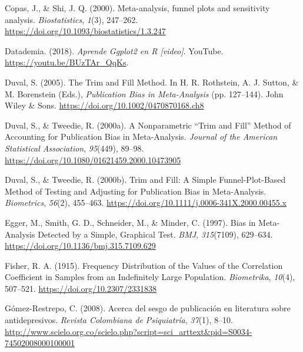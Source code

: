 \documentclass[
  bookmarksnumbered]{article}
\newlength{\cslhangindent}
\newlength{\cslentryspacingunit} %
\newenvironment{CSLReferences}[2] %
 {%
  \setlength{\parindent}{0pt}
  \ifodd #1
  \let\oldpar\par
  \def\par{\hangindent=\cslhangindent\oldpar}
  \fi
  \setlength{\parskip}{#2\cslentryspacingunit}
 }%
 {}
\begin{document}
\begin{CSLReferences}{1}{0}
\leavevmode{}%
Copas, J., \& Shi, J. Q. (2000). Meta-analysis, funnel plots and sensitivity analysis. \emph{Biostatistics}, \emph{1}(3), 247--262. \url{https://doi.org/10.1093/biostatistics/1.3.247}

\leavevmode{}%
Datademia. (2018). \emph{Aprende {Ggplot2} en {R} \emph{{[}video{]}}}. YouTube. \url{https://youtu.be/BUzTAr_QqKs}.

\leavevmode{}%
Duval, S. (2005). The {Trim} and {Fill Method}. In H. R. Rothstein, A. J. Sutton, \& M. Borenstein (Eds.), \emph{Publication {Bias} in {Meta-Analysis}} (pp. 127--144). {John Wiley \& Sons}. \url{https://doi.org/10.1002/0470870168.ch8}

\leavevmode{}%
Duval, S., \& Tweedie, R. (2000a). A {Nonparametric} {``{Trim} and {Fill}''} {Method} of {Accounting} for {Publication Bias} in {Meta-Analysis}. \emph{Journal of the American Statistical Association}, \emph{95}(449), 89--98. \url{https://doi.org/10.1080/01621459.2000.10473905}

\leavevmode{}%
Duval, S., \& Tweedie, R. (2000b). Trim and {Fill}: {A Simple Funnel-Plot-Based Method} of {Testing} and {Adjusting} for {Publication Bias} in {Meta-Analysis}. \emph{Biometrics}, \emph{56}(2), 455--463. \url{https://doi.org/10.1111/j.0006-341X.2000.00455.x}

\leavevmode{}%
Egger, M., Smith, G. D., Schneider, M., \& Minder, C. (1997). {Bias in Meta-Analysis Detected by a Simple, Graphical Test}. \emph{BMJ}, \emph{315}(7109), 629--634. \url{https://doi.org/10.1136/bmj.315.7109.629}

\leavevmode{}%
Fisher, R. A. (1915). Frequency {Distribution} of the {Values} of the {Correlation Coefficient} in {Samples} from an {Indefinitely Large Population}. \emph{Biometrika}, \emph{10}(4), 507--521. \url{https://doi.org/10.2307/2331838}

\leavevmode{}%
Gómez-Restrepo, C. (2008). {Acerca del sesgo de publicación en literatura sobre antidepresivos}. \emph{Revista Colombiana de Psiquiatría}, \emph{37}(1), 8--10. \url{http://www.scielo.org.co/scielo.php?script=sci_arttext\&pid=S0034-74502008000100001}


\end{CSLReferences}
\end{document}
